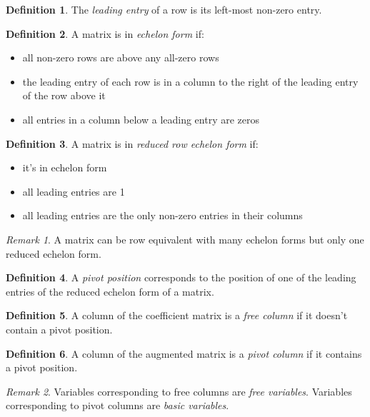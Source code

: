 \documentclass{article}
\theoremstyle{definition}
\newtheorem{definition}{Definition}[section]
\theoremstyle{remark}
\newtheorem*{remark}{Remark}
\theoremstyle{remark}
\theoremstyle{remark}
\newtheorem*{it follows}{It follows}
\begin{document}
\begin{definition}
  The \textit{leading entry} of a row is its left-most non-zero entry.
\end{definition}

\begin{definition}
  A matrix is in \textit{echelon form} if:
  \begin{itemize}
    \item all non-zero rows are above any all-zero rows
    \item the leading entry of each row is in a column to the right of the leading entry of the row above it
    \item all entries in a column below a leading entry are zeros
  \end{itemize}
\end{definition}

\begin{definition}
  A matrix is in \textit{reduced row echelon form} if:
  \begin{itemize}
    \item it's in echelon form
    \item all leading entries are 1
    \item all leading entries are the only non-zero entries in their columns
  \end{itemize}
\end{definition}

\begin{remark}
  A matrix can be row equivalent with many echelon forms but only one reduced echelon form.
\end{remark}

\begin{definition}
  A \textit{pivot position} corresponds to the position of one of the leading entries of the reduced echelon form of a matrix.
\end{definition}

\begin{definition}
  A column of the coefficient matrix is a \textit{free column} if it doesn't contain a pivot position.
\end{definition}

\begin{definition}
  A column of the augmented matrix is a \textit{pivot column} if it contains a pivot position.
\end{definition}

\begin{remark}
  Variables corresponding to free columns are \textit{free variables}. Variables corresponding to pivot columns are \textit{basic variables}.
\end{remark}
\end{document}
